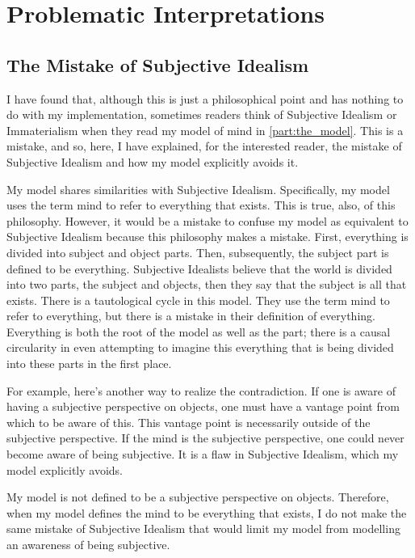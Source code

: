 \chapter{Problematic Interpretations}
\label{chapter:problematic_interpretations}

\section{The Mistake of Subjective Idealism}
\label{section:the_mistake_of_subjective_idealism}

I have found that, although this is just a philosophical point and has
nothing to do with my implementation, sometimes readers think of
Subjective Idealism or Immaterialism \citep{berkeley:1734} when they
read my model of mind in \autoref{part:the_model}.  This is a mistake,
and so, here, I have explained, for the interested reader, the mistake
of Subjective Idealism and how my model explicitly avoids it.

My model shares similarities with Subjective Idealism.  Specifically,
my model uses the term mind to refer to everything that exists.  This
is true, also, of this philosophy.  However, it would be a mistake to
confuse my model as equivalent to Subjective Idealism because this
philosophy makes a mistake.  First, everything is divided into subject
and object parts.  Then, subsequently, the subject part is defined to
be everything.  Subjective Idealists believe that the world is divided
into two parts, the subject and objects, then they say that the
subject is all that exists.  There is a tautological cycle in this
model.  They use the term mind to refer to everything, but there is a
mistake in their definition of everything.  Everything is both the
root of the model as well as the part; there is a causal circularity
in even attempting to imagine this everything that is being divided
into these parts in the first place.

For example, here's another way to realize the contradiction.  If one
is aware of having a subjective perspective on objects, one must have
a vantage point from which to be aware of this.  This vantage point is
necessarily outside of the subjective perspective.  If the mind is the
subjective perspective, one could never become aware of being
subjective.  It is a flaw in Subjective Idealism, which my model
explicitly avoids.

My model is not defined to be a subjective perspective on objects.
Therefore, when my model defines the mind to be everything that
exists, I do not make the same mistake of Subjective Idealism that
would limit my model from modelling an awareness of being subjective.

